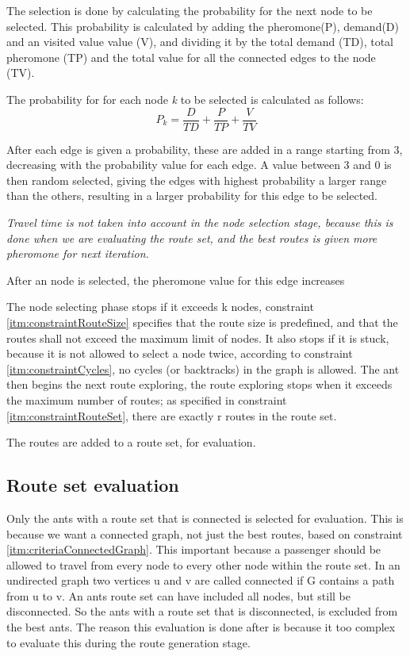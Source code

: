 The selection is done by calculating the probability for the next node to be selected. This probability is calculated by adding the pheromone(P), demand(D) and an visited value value (V), and dividing it by the total demand (TD), total pheromone (TP) and the total value for all the connected edges to the node (TV).

The probability for for each node \textit{k} to be selected is calculated as follows:
$$ P_{k} = \frac{D}{TD} + \frac{P}{TP} + \frac{V}{TV}$$ 

After each edge is given a probability, these are added in a range starting from 3, decreasing with the probability value for each edge. A value between 3 and 0 is then random selected, giving the edges with highest probability a larger range than the others, resulting in a larger probability for this edge to be selected. 

\textit{Travel time is not taken into account in the node selection stage, because this is done when we are evaluating the route set, and the best routes is given more pheromone for next iteration.} %

After an node is selected, the pheromone value for this edge increases 

The node selecting phase stops if it exceeds k nodes, constraint \ref{itm:constraintRouteSize} specifies that the route size is predefined, and that the routes shall not exceed the maximum limit of nodes. It also stops if it is stuck, because it is not allowed to select a node twice, according to constraint \ref{itm:constraintCycles}, no cycles (or backtracks) in the graph is allowed. The ant then begins the next route exploring, the route exploring stops when it exceeds the maximum number of routes; as specified in constraint \ref{itm:constraintRouteSet}, there are exactly r routes in the route set. 

The routes are added to a route set, for evaluation.

\subsection{Route set evaluation}

Only the ants with a route set that is connected is selected for evaluation. This is because we want a connected graph, not just the best routes, based on constraint \ref{itm:criteriaConnectedGraph}. This important because a passenger should be allowed to travel from every node to every other node within the route set. In an undirected graph two vertices u and v are called connected if G contains a path from u to v. An ants route set can have included all nodes, but still be disconnected. So the ants with a route set that is disconnected, is excluded from the best ants. The reason this evaluation is done after is because it too complex to evaluate this during the route generation stage. 

